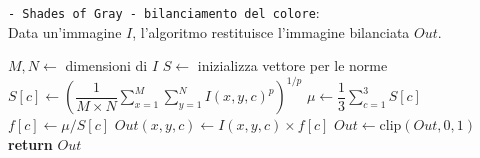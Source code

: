 \begin{algorithm}[H]
    \caption{\texttt{- Shades of Gray - bilanciamento del colore}:\\ Data un'immagine $I$, l'algoritmo restituisce l'immagine bilanciata $Out$.} \label{alg:shades_of_gray}
    \begin{algorithmic}[1]
            \State $M, N \gets$ dimensioni di $I$
            \State $S \gets$ inizializza vettore per le norme
             
                \State $S[c] \gets \left(\dfrac{1}{M \times N} \sum_{x=1}^{M} \sum_{y=1}^{N} I(x,y,c)^p \right)^{1/p}$ 
            \EndFor
            \State $\mu \gets \dfrac{1}{3} \sum_{c=1}^{3} S[c]$ 
                \State $f[c] \gets \mu / S[c]$ 
                        \State $Out(x,y,c) \gets I(x,y,c) \times f[c]$ 
                    \EndFor
                \EndFor
            \EndFor
            \State $Out \gets \text{clip}(Out, 0, 1)$ 
            \State \textbf{return} $Out$
        \EndFunction
    \end{algorithmic}
\end{algorithm}

\cleardoublepage